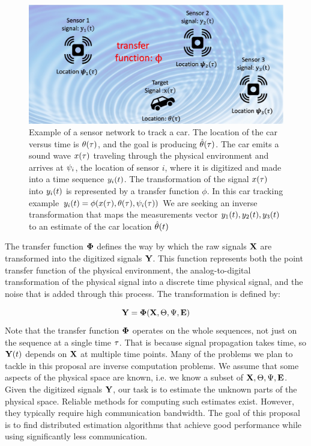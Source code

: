 \begin{figure}[t]
\centering
\includegraphics[width=0.5\columnwidth]{figs/Framework.jpg}
\caption{\label{fig:prototypicalSensorNetwork}Example of a sensor
  network to track a car. The location of the car versus
  time is $\theta(\tau)$, and the goal is producing
  $\hat{\theta}(\tau)$. The car emits a sound wave
  $x(\tau)$ traveling through the physical environment
  and arrives at $\psi_i$, the location of sensor $i$, where it is digitized and made into a time sequence $y_i(t)$. The transformation of the signal $x(\tau)$ into $y_i(t)$ is represented by a transfer function $\phi$. In this car tracking example 
$y_i(t) =
\phi(x(\tau),\theta(\tau),\psi_i(\tau))$
We are seeking an inverse transformation that  maps the measurements vector $y_1(t),y_2(t),y_3(t)$ to an estimate of the car location $\hat{\theta}(t)$}
\end{figure}

The transfer function $\mathbf{\Phi}$ defines the way by which the raw signals $\mathbf{X}$ are transformed into the digitized signals $\mathbf{Y}$. This function represents both the point transfer function of the physical environment,
the analog-to-digital transformation of the physical signal into a discrete time physical signal, and the noise that is added through this process. The transformation is defined by:\

\begin{equation}
\mathbf{Y} = \mathbf{\Phi}(\mathbf{X},\Theta,\Psi,\mathbf{E})\label{eq:transfer}
\end{equation}
Note that the transfer function $\mathbf{\Phi}$ operates on the whole sequences, not just on the sequence at a single time $\tau$. That is because signal propagation takes time, so $\mathbf{Y}(t)$ depends on $\mathbf{X}$ at multiple time points.
Many of the problems we plan to tackle in this proposal are inverse
computation problems. We assume that some aspects of the physical
space are known, i.e. we know a subset of
$\mathbf{X},\Theta,\Psi,\mathbf{E}$. Given the digitized signals
$\mathbf{Y}$, our task is to estimate the unknown parts of the physical
space. Reliable methods for computing such estimates exist. However,
they typically require high communication bandwidth. The goal of this
proposal is to find distributed estimation algorithms that achieve
good performance while using significantly less communication.

